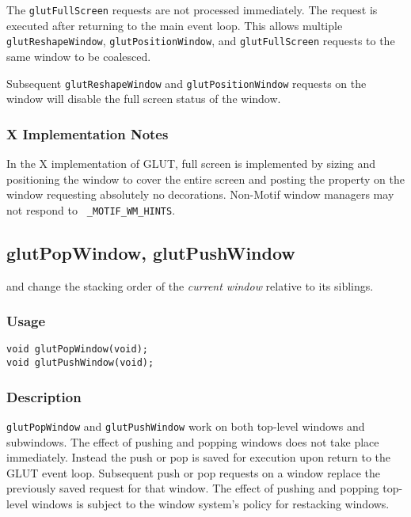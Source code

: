 The {\tt glutFullScreen} requests are not processed immediately.
The request is executed after returning to the main event loop.
This allows multiple {\tt glutReshapeWindow}, {\tt glutPositionWindow},
and {\tt glutFullScreen} requests to the same window to be coalesced.

Subsequent {\tt glutReshapeWindow} and {\tt glutPositionWindow} requests
on the window will disable the full screen status of the window.

\subsubsection*{X Implementation Notes}

In the X implementation of GLUT, full screen is implemented by sizing
and positioning the window to cover the entire screen and posting the
 property on the window requesting absolutely no
decorations.  Non-Motif window managers may not respond to {\tt
\_MOTIF\_WM\_HINTS}.

\subsection{glutPopWindow, glutPushWindow}

 and  change the stacking order
of the {\em current window} relative to its siblings.

\subsubsection*{Usage}
\begin{verbatim}
void glutPopWindow(void);
void glutPushWindow(void);
\end{verbatim}

\subsubsection*{Description}

{\tt glutPopWindow} and {\tt glutPushWindow} work on both top-level
windows and subwindows.  The effect of pushing and popping windows
does not take place immediately.  Instead the push or pop is saved
for execution upon return to the GLUT event loop.  Subsequent
push or pop requests on a window replace the previously saved
request for that window.  The effect of pushing and popping
top-level windows is subject to the window system's policy for
restacking windows.

